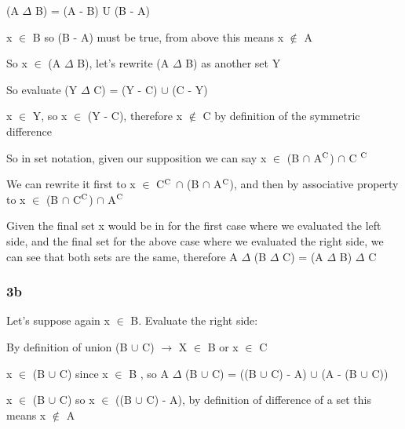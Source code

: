 \documentclass{article}
\begin{document}
\noindent (A $\Delta$ B) = (A - B) U (B - A) \vspace{0.5cm}

\noindent x $\in$ B so (B - A) must be true, from above this means x $\not\in$ A \vspace{0.5cm}

\noindent So x $\in$ (A $\Delta$ B), let's rewrite (A $\Delta$ B) as another set Y \vspace{0.5cm}

\noindent So evaluate (Y $\Delta$ C) = (Y - C) $\cup$ (C - Y) \vspace{0.5cm}

\noindent x $\in$ Y, so x $\in$ (Y - C), therefore x $\not\in$ C by definition of the symmetric difference \vspace{0.5cm}

\noindent So in set notation, given our supposition we can say x $\in$ (B $\cap$ A$\textsuperscript{C}$) $\cap$ C $\textsuperscript{C}$ \vspace{0.5cm}

\noindent We can rewrite it first to x $\in$ C$\textsuperscript{C}$ $\cap$ (B $\cap$ A$\textsuperscript{C}$), and then by associative property to x $\in$ (B $\cap$ C$\textsuperscript{C}$) $\cap$ A$\textsuperscript{C}$ \vspace{0.5cm} 

\noindent Given the final set x would be in for the first case where we evaluated the left side, and the final set for the above case where we evaluated the right side, we can see that both sets are the same, therefore A $\Delta$ (B $\Delta$ C) = (A $\Delta$ B) $\Delta$ C

\subsubsection{3b}

Let's suppose again x $\in$ B.  Evaluate the right side: \vspace{0.5cm}

\noindent By definition of union (B $\cup$ C) $\rightarrow$ X $\in$ B or x $\in$ C \vspace{0.5cm}

\noindent x $\in$ (B $\cup$ C) since x $\in$ B \vspace{0.5cm}, so A $\Delta$ (B $\cup$ C) = ((B $\cup$ C) - A) $\cup$ (A - (B $\cup$ C)) \vspace{0.5cm}

\noindent x $\in$ (B $\cup$ C) so x $\in$ ((B $\cup$ C) - A), by definition of difference of a set this means x $\not\in$ A \vspace{0.5cm}
\end{document}
